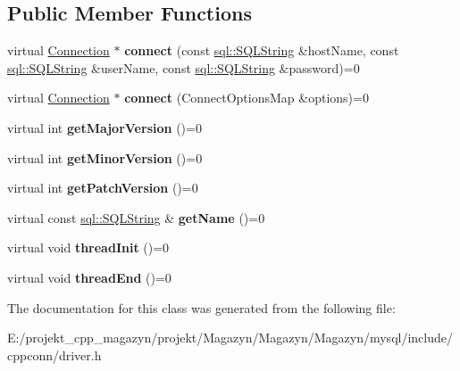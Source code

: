 \subsection*{Public Member Functions}
\begin{DoxyCompactItemize}
\item 
\hypertarget{classsql_1_1_driver_a5dddccb95a32c265602b803d7a53d6a8}{}\label{classsql_1_1_driver_a5dddccb95a32c265602b803d7a53d6a8} 
virtual \hyperlink{classsql_1_1_connection}{Connection} $\ast$ {\bfseries connect} (const \hyperlink{classsql_1_1_s_q_l_string}{sql\+::\+S\+Q\+L\+String} \&host\+Name, const \hyperlink{classsql_1_1_s_q_l_string}{sql\+::\+S\+Q\+L\+String} \&user\+Name, const \hyperlink{classsql_1_1_s_q_l_string}{sql\+::\+S\+Q\+L\+String} \&password)=0
\item 
\hypertarget{classsql_1_1_driver_a20b70418563cf052a74a45d1ecb2187e}{}\label{classsql_1_1_driver_a20b70418563cf052a74a45d1ecb2187e} 
virtual \hyperlink{classsql_1_1_connection}{Connection} $\ast$ {\bfseries connect} (Connect\+Options\+Map \&options)=0
\item 
\hypertarget{classsql_1_1_driver_adbb7ba637734664d05a4abd8600347a3}{}\label{classsql_1_1_driver_adbb7ba637734664d05a4abd8600347a3} 
virtual int {\bfseries get\+Major\+Version} ()=0
\item 
\hypertarget{classsql_1_1_driver_a6f4d2599b74a49687281aff75d4e5ca3}{}\label{classsql_1_1_driver_a6f4d2599b74a49687281aff75d4e5ca3} 
virtual int {\bfseries get\+Minor\+Version} ()=0
\item 
\hypertarget{classsql_1_1_driver_ac4ed640d76190e68dfe79354b8431e24}{}\label{classsql_1_1_driver_ac4ed640d76190e68dfe79354b8431e24} 
virtual int {\bfseries get\+Patch\+Version} ()=0
\item 
\hypertarget{classsql_1_1_driver_a06d2dc9c3afdd160f7bbca73495d204a}{}\label{classsql_1_1_driver_a06d2dc9c3afdd160f7bbca73495d204a} 
virtual const \hyperlink{classsql_1_1_s_q_l_string}{sql\+::\+S\+Q\+L\+String} \& {\bfseries get\+Name} ()=0
\item 
\hypertarget{classsql_1_1_driver_acf4b00be0f101a438ed559cc642f5f54}{}\label{classsql_1_1_driver_acf4b00be0f101a438ed559cc642f5f54} 
virtual void {\bfseries thread\+Init} ()=0
\item 
\hypertarget{classsql_1_1_driver_a3bff3ef723874f9455e423472d08e630}{}\label{classsql_1_1_driver_a3bff3ef723874f9455e423472d08e630} 
virtual void {\bfseries thread\+End} ()=0
\end{DoxyCompactItemize}


The documentation for this class was generated from the following file\+:\begin{DoxyCompactItemize}
\item 
E\+:/projekt\+\_\+cpp\+\_\+magazyn/projekt/\+Magazyn/\+Magazyn/\+Magazyn/mysql/include/cppconn/driver.\+h\end{DoxyCompactItemize}
